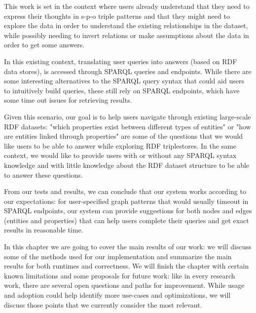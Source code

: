 This work is set in the context where users already understand that they need to express their thoughts in s-p-o triple patterns and that they might need to explore the data in order to understand the existing relationships in the dataset, while possibly needing to invert relations or make assumptions about the data in order to get some answers.

In this existing context, translating user queries into answers (based on RDF data stores), is accessed through SPARQL queries and endpoints. While there are some interesting alternatives to the SPARQL query syntax that could aid users to intuitively build queries, these still rely on SPARQL endpoints, which have some time out issues for retrieving results.

Given this scenario, our goal is to help users navigate through existing large-scale RDF datasets: "which properties exist between different types of entities" or "how are entities linked through properties" are some of the questions that we would like users to be able to answer while exploring RDF triplestores. In the same context, we would like to provide users with or without any SPARQL syntax knowledge and with little knowledge about the RDF dataset structure to be able to answer these questions.

From our tests and results, we can conclude that our system works according to our expectations: for user-specified graph patterns that would usually timeout in SPARQL endpoints, our system can provide suggestions for both nodes and edges (entities and properties) that can help users complete their queries and get exact results in reasonable time.

In this chapter we are going to cover the main results of our work: 
we will discuss some of the methods used for our implementation and summarize the main results for both runtimes and correctness. 
We will finish the chapter with certain known limitations and some proposals for future work: 
like in every research work, there are several open questions and paths for improvement. 
While usage and adoption could help identify more use-cases and optimizations, 
we will discuss those points that we currently consider the most relevant.


